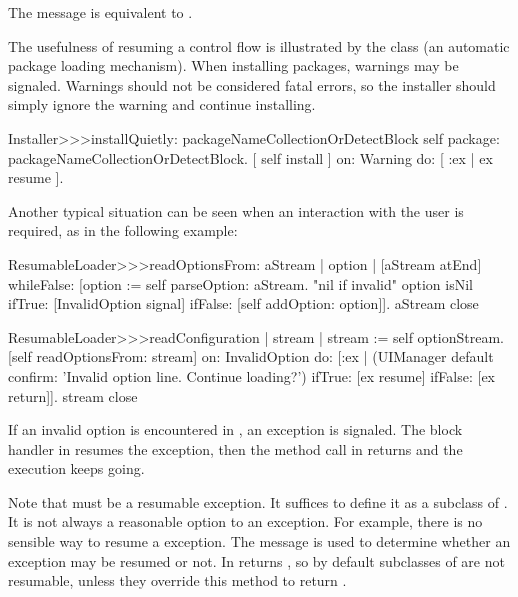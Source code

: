 \documentclass[a4paper,10pt,twoside]{book}
\begin{document}
The message  is equivalent to .

The usefulness of resuming a control flow is illustrated by the class  (an automatic package loading mechanism). When installing packages, warnings may be signaled. Warnings should not be considered fatal errors, so the installer should simply ignore the warning and continue installing.

\begin{code}{}
Installer>>>installQuietly: packageNameCollectionOrDetectBlock 
	self package: packageNameCollectionOrDetectBlock. 
	 [ self install ] on: Warning do: [ :ex | ex resume ]. 
\end{code}


Another typical situation can be seen when an interaction with the user is required, as in the following example:
\begin{code}{}
ResumableLoader>>>readOptionsFrom: aStream 
	| option |
	[aStream atEnd]
		whileFalse: [option := self parseOption: aStream.
			"nil if invalid"
			option isNil
				ifTrue: [InvalidOption signal]
				ifFalse: [self addOption: option]].
	aStream close

ResumableLoader>>>readConfiguration
	| stream |
	stream := self optionStream.
	[self readOptionsFrom: stream]
		on: InvalidOption
		do: [:ex | (UIManager default confirm: 'Invalid option line. Continue loading?')
				ifTrue: [ex resume]
				ifFalse: [ex return]].
	stream close
\end{code}

If an invalid option is encountered in , an  exception is signaled. The block handler in  resumes the exception, then the  method call in  returns and the execution keeps going.

Note that  must be a resumable exception. It suffices to define it as a subclass of .
It is not always a reasonable option to  an exception. For example, there is no sensible way to resume a  exception. The message  is used to determine whether an exception may be resumed or not. In  returns , so by default subclasses of  are not resumable, unless they override this method to return .
\end{document}
